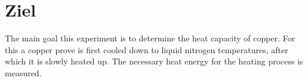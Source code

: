 \section{Ziel}
\label{sec:ziel}
The main goal this experiment is to determine the heat capacity of copper.
For this a copper prove is first cooled down to liquid nitrogen temperatures, after which it is slowly heated up.
The necessary heat energy for the heating process is measured.